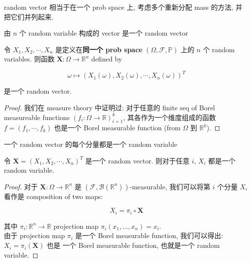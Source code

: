 \documentclass{qlnotes-export}
\begin{document}
random vector 相当于在一个 prob space 上, 考虑多个重新分配 mass 的方法, 并把它们并列起来.

\begin{proposition}{由 \(n\) 个 random variable 构成的 vector 是一个 random vector}\label{prop-03-joint-conditional-distribution-n-random-variable-vector-random-vector}

令 \(X_{1},X_{2},\cdots,X_{n}\) 是定义在\textbf{同一个 prob space} \((\Omega,\mathcal{F},{\mathbb{P}})\) 上的 \(n\) 个 random variables. 则函数 \(\mathbf{X}:\Omega\rightarrow{\mathbb{R}}^{n}\) defined by

\[\omega\mapsto(X_{1}(\omega),X_{2}(\omega),\cdots,X_{n}(\omega))^{T}\]

是一个 random vector.

\end{proposition}

\begin{proof}

我们在 measure theory 中证明过: 对于任意的 finite seq of Borel measureable functions \((f_{i}:\Omega\rightarrow{\mathbb{R}})_{i = 1}^{k}\), 其各作为一个维度组成的函数 \(f = (f_{1},\cdots,f_{k})\) 也是一个 Borel measurable function (from \(\Omega\) 到 \({\mathbb{R}}^{k}\)).

\end{proof}

\begin{proposition}{一个 random vector 的每个分量都是一个 random variable}\label{prop-03-joint-conditional-distribution-random-vector-random-variable}

令 \(\mathbf{X} = (X_{1},X_{2},\cdots,X_{n})^{T}\) 是一个 random vector. 则对于任意 \(i\), \(X_{i}\) 都是一个 random variable.

\end{proposition}

\begin{proof}

对于 \(\mathbf{X}:\Omega\rightarrow{\mathbb{R}}^{n}\) 是 \((\mathcal{F},\mathcal{B}({\mathbb{R}}^{n}))\)-measurable, 我们可以将第 \(i\) 个分量 \(X_{i}\) 看作是 composition of two maps:

\[X_{i} = \pi_{i} \circ \mathbf{X}\]

其中 \(\pi_{i}:{\mathbb{R}}^{n}\rightarrow{\mathbb{R}}\) projection map \(\pi_{i}(x_{1},\ldots,x_{n}) = x_{i}\).\\
由于 projection map \(\pi_{i}\) 是一个 Borel measurable function, 我们可以得出: \(X_{i} = \pi_{i}(\mathbf{X})\) 也是 一个 Borel measurable function, 也就是一个 random variable.

\end{proof}
\end{document}
